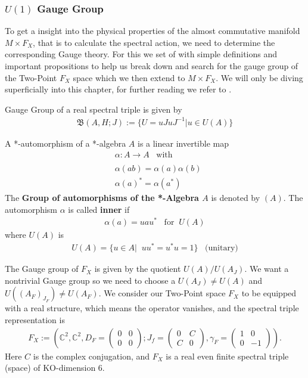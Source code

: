 \subsubsection{$U(1)$ Gauge Group}
To get a insight into the physical properties of the almost commutative
manifold $M\times F_X$, that is to calculate the spectral action, we need to
determine the corresponding Gauge theory.
For this we set of with simple definitions and important propositions to
help us break down and search for the gauge group of the Two-Point $F_X$
space which we then extend to $M\times F_X$. We will only be diving
superficially into this chapter, for further reading we refer to
\cite{ncgwalter}.
\begin{definition}
Gauge Group of a real spectral triple is given by
\begin{align}
    \mathfrak{B}(A, H; J) := \{ U = uJuJ^{-1} | u\in U(A)\}
\end{align}
\end{definition}
\begin{definition}
    A *-automorphism of a *-algebra $A$ is a linear invertible
    map
    \begin{align}
        &\alpha:A \rightarrow A\;\;\; \text{with}\\
        \nonumber\\
        &\alpha(ab) = \alpha(a)\alpha(b)\\
        &\alpha(a)^* = \alpha(a^*)
    \end{align}
    The \textbf{Group of automorphisms of the *-Algebra $A$} is denoted by
    $(A)$.\newline
    The automorphism $\alpha$ is called \textbf{inner} if
    \begin{align}
        \alpha(a) = u a u^* \;\;\; \text{for} \;\; U(A)
    \end{align}
    where $U(A)$ is
    \begin{align}
        U(A) = \{ u\in A|\;\; uu^* = u^*u=1\} \;\;\;
        \text{(unitary)}
    \end{align}
\end{definition}
The Gauge group of $F_X$ is given by the quotient $U(A)/U(A_J)$.
We want a nontrivial Gauge group so we need to choose a $U(A_J) \neq
U(A)$ and $U((A_F)_{J_F}) \neq U(A_F)$.
We consider our Two-Point space $F_X$ to be equipped with a real structure,
which means the operator vanishes, and the spectral triple representation is
\begin{align}
    F_X := \left(\mathbb{C}^2,\mathbb{C}^2, D_F =\begin{pmatrix}
        0&0\\0&0\end{pmatrix}; J_f =\begin{pmatrix}
    0&C\\C&0\end{pmatrix},
            \gamma_F = \begin{pmatrix}1&0\\0&-1\end{pmatrix}\right).
\end{align}
Here $C$ is the complex conjugation, and $F_X$ is a real even finite
spectral triple (space) of KO-dimension 6.

